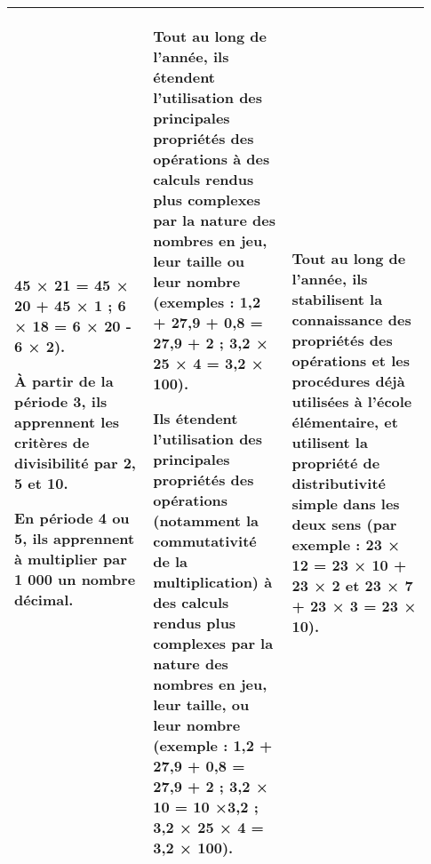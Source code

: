 {\begin{tabular}{|p{0.31\linewidth}|p{0.31\linewidth}|p{0.31\linewidth}|}
45 × 21 = 45 × 20 + 45 × 1 ; 6 × 18 = 6 × 20 - 6 × 2).\par\vspace{0.25cm}
À partir de la \textbf{période 3}, ils apprennent les critères
de divisibilité par 2, 5 et 10.\par\vspace{0.25cm}
En \textbf{période 4 ou 5}, ils apprennent à multiplier par
1 000 un nombre décimal.
&
Tout au long de l’année, ils étendent l’utilisation des
principales propriétés des opérations à des calculs
rendus plus complexes par la nature des nombres
en jeu, leur taille ou leur nombre (exemples :
1,2 + 27,9 + 0,8 = 27,9 + 2 ; 3,2 × 25 × 4 = 3,2 × 100).\par\vspace{0.25cm}
Ils étendent l’utilisation des principales propriétés
des opérations (notamment la commutativité de la
multiplication) à des calculs rendus plus complexes
par la nature des nombres en jeu, leur taille, ou leur
nombre (exemple : 1,2 + 27,9 + 0,8 = 27,9 + 2 ;
3,2 × 10 = 10 ×3,2 ; 3,2 × 25 × 4 = 3,2 × 100).
&
Tout au long de l’année, ils stabilisent la
connaissance des propriétés des opérations et les
procédures déjà utilisées à l’école élémentaire, et
utilisent la propriété de distributivité simple dans
les deux sens (par exemple :
23 × 12 = 23 × 10 + 23 × 2 et
23 × 7 + 23 × 3 = 23 × 10).
\\\hline
\end{tabular}
\renewcommand{\arraystretch}{1}
}